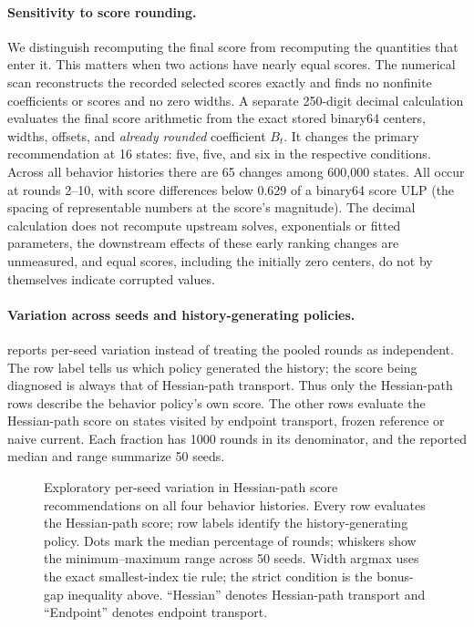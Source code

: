 \paragraph{Sensitivity to score rounding.}
We distinguish recomputing the final score from recomputing the quantities
that enter it.  This matters when two actions have nearly equal scores.
The numerical scan reconstructs the recorded selected scores exactly and
finds no nonfinite coefficients or scores and no zero widths.  A separate
250-digit decimal calculation evaluates the final score arithmetic from the
exact stored binary64 centers, widths, offsets, and \emph{already rounded}
coefficient $B_t$.  It changes the primary recommendation at 16 states:
five, five, and six in the respective conditions.  Across all behavior
histories there are 65 changes among 600,000 states.  All occur at rounds
2--10, with score differences below 0.629 of a binary64 score ULP
(the spacing of representable numbers at the score's magnitude).
The decimal calculation does not recompute upstream solves, exponentials or
fitted parameters, the downstream effects of these early ranking changes are
unmeasured, and equal scores, including the initially zero centers, do not by
themselves indicate corrupted values.


\paragraph{Variation across seeds and history-generating policies.}
 reports per-seed variation
instead of treating the pooled rounds as independent.  The row label tells
us which policy generated the history; the score being diagnosed is always
that of Hessian-path transport.  Thus only the Hessian-path rows describe the
behavior policy's own score.  The other rows evaluate the Hessian-path score on
states visited by endpoint transport, frozen reference or naive current.
Each fraction has 1000 rounds in its denominator, and the
reported median and range summarize 50 seeds.

\begin{figure}[p]
  \centering
  
  \caption{Exploratory per-seed variation in Hessian-path score recommendations on
  all four behavior histories.  Every row evaluates the Hessian-path score; row
  labels identify the history-generating policy.  Dots mark the median percentage of rounds; whiskers show
  the minimum--maximum range across 50 seeds.  Width argmax uses the exact
  smallest-index tie rule; the strict condition is the bonus-gap inequality
  above. ``Hessian'' denotes Hessian-path transport and ``Endpoint'' denotes
  endpoint transport.}
  \label{fig:transport-followup-mechanism-variation}
\end{figure}


